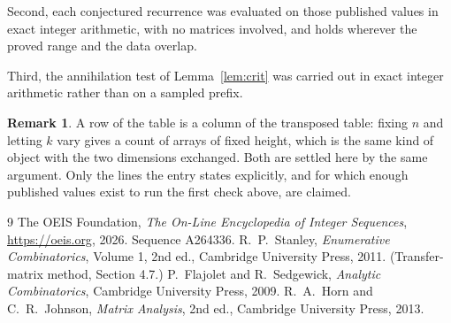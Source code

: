 \documentclass[11pt,a4paper]{article}
\theoremstyle{plain}
\theoremstyle{definition}
\newtheorem{remark}[theorem]{Remark}
\begin{document}
Second, each conjectured recurrence was evaluated on those published values in exact
integer arithmetic, with no matrices involved, and holds wherever the proved range and the
data overlap.

Third, the annihilation test of Lemma~\ref{lem:crit} was carried out in exact integer
arithmetic rather than on a sampled prefix.

\begin{remark}
A row of the table is a column of the transposed table: fixing $n$ and letting $k$ vary gives a
count of arrays of fixed height, which is the same kind of object with the two dimensions
exchanged. Both are settled here by the same argument. Only the lines the entry states
explicitly, and for which enough published values exist to run the first check above, are
claimed.
\end{remark}

\begin{thebibliography}{9}
 The OEIS Foundation, \emph{The On-Line Encyclopedia of Integer
Sequences}, \url{https://oeis.org}, 2026. Sequence A264336.
 R.~P.~Stanley, \emph{Enumerative Combinatorics}, Volume 1, 2nd ed.,
Cambridge University Press, 2011. (Transfer-matrix method, Section 4.7.)
 P.~Flajolet and R.~Sedgewick, \emph{Analytic Combinatorics}, Cambridge
University Press, 2009.
 R.~A.~Horn and C.~R.~Johnson, \emph{Matrix Analysis}, 2nd ed., Cambridge
University Press, 2013.
\end{thebibliography}
\end{document}
